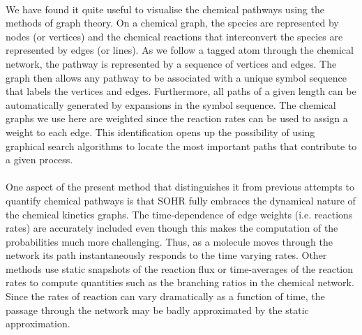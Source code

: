 \paragraph{}
We have found it quite useful to visualise the chemical pathways using the methods
of graph theory. On a chemical graph, the species are represented by nodes (or vertices)
and the chemical reactions that interconvert the species are represented by edges (or
lines).\cite{ch1_IRPC_27_christiansen1953elucidation,ch1_IRPC_28_hansen1988chemical,ch1_IRPC_29_balaban1976chemical,ch1_IRPC_30_temkin1992application,ch1_IRPC_31_lu2005directed} As we follow a tagged atom through the chemical network, the pathway
is represented by a sequence of vertices and edges. The graph then allows any pathway
to be associated with a unique symbol sequence that labels the vertices and edges. Furthermore,
all paths of a given length can be automatically generated by expansions in
the symbol sequence. The chemical graphs we use here are weighted since the reaction
rates can be used to assign a weight to each edge. This identification opens up the possibility
of using graphical search algorithms to locate the most important paths that contribute
to a given process.
\newline
\paragraph{}
One aspect of the present method that distinguishes it from previous attempts to
quantify chemical pathways\cite{ch1_IRPC_20_lehmann2004algorithm,ch3_17_kee2008chemkin} is that SOHR fully embraces the dynamical nature
of the chemical kinetics graphs. The time-dependence of edge weights (i.e. reactions
rates) are accurately included even though this makes the computation of the probabilities
much more challenging. Thus, as a molecule moves through the network its path
instantaneously responds to the time varying rates. Other methods use static snapshots
of the reaction flux or time-averages of the reaction rates to compute quantities such as
the branching ratios in the chemical network. Since the rates of reaction can vary dramatically
as a function of time, the passage through the network may be badly approximated
by the static approximation.
\newline
